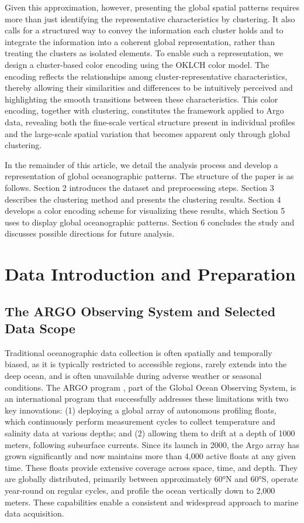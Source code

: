\documentclass[11pt]{article}
\theoremstyle{plain}
\begin{document}
Given this approximation, however, presenting the global spatial patterns requires more than just identifying the representative characteristics by clustering. It also calls for a structured way to convey the information each cluster holds and to integrate the information into a coherent global representation, rather than treating the clusters as isolated elements. To enable such a representation, we design a cluster-based color encoding using the OKLCH color model. The encoding reflects the relationships among cluster-representative characteristics, thereby allowing their similarities and differences to be intuitively perceived and highlighting the smooth transitions between these characteristics. This color encoding, together with clustering, constitutes the framework applied to Argo data, revealing both the fine-scale vertical structure present in individual profiles and the large-scale spatial variation that becomes apparent only through global clustering.

In the remainder of this article, we detail the analysis process and develop a representation of global oceanographic patterns. The structure of the paper is as follows. Section 2 introduces the dataset and preprocessing steps. Section 3 describes the clustering method and presents the clustering results. Section 4 develops a color encoding scheme for visualizing these results, which Section 5 uses to display global oceanographic patterns. Section 6 concludes the study and discusses possible directions for future analysis.

\section{Data Introduction and Preparation}
\subsection{The ARGO Observing System and Selected Data Scope} 
Traditional oceanographic data collection is often spatially and temporally biased, as it is typically restricted to accessible regions, rarely extends into the deep ocean, and is often unavailable during adverse weather or seasonal conditions. The ARGO program \citep{wong2020argo}, part of the Global Ocean Observing System, is an international program that successfully addresses these limitations with two key innovations: (1) deploying a global array of autonomous profiling floats, which continuously perform measurement cycles to collect temperature and salinity data at various depths; and (2) allowing them to drift at a depth of 1000 meters, following subsurface currents. Since its launch in 2000, the Argo array has grown significantly and now maintains more than 4,000 active floats at any given time. These floats provide extensive coverage across space, time, and depth. They are globally distributed, primarily between approximately 60°N and 60°S, operate year-round on regular cycles, and profile the ocean vertically down to 2,000 meters. These capabilities enable a consistent and widespread approach to marine data acquisition. 
\end{document}
